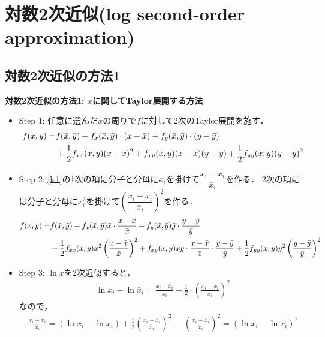 \documentclass[a4paper,12pt,onecolumn,oneside,notitlepage,final]{article}
\begin{document}
\section{対数2次近似(log second-order approximation)}
\subsection{対数2次近似の方法1}

\begin{itembox}[l]{{\bf 対数2次近似の方法1: $x$に関してTaylor展開する方法}}
\begin{itemize}
\item Step 1: 任意に選んだ$\bar x$の周りで$f$に対して2次のTaylor展開を施す．
\begin{align}
f(x,y) = &f(\bar x, \bar y) + f_x(\bar x, \bar y) \cdot (x-\bar x) + f_y(\bar x, \bar y) \cdot (y-\bar y)\notag \\
&+ \frac{1}{2}f_{xx}(\bar x, \bar y) (x-\bar x)^2 + f_{xy}(\bar x, \bar y) (x-\bar x)(y-\bar y) + \frac{1}{2}f_{yy}(\bar x, \bar y) (y-\bar y)^2 \label{ls1}
\end{align}
\item Step 2: \eqref{ls1}の1次の項に分子と分母に$x_i$を掛けて$\dfrac{x_i-\bar x_i}{\bar x_i}$を作る． 2次の項には分子と分母に$x_i^2$を掛けて$\left(\dfrac{x_i-\bar x_i}{\bar x_i}\right)^2$を作る．
\begin{align}
f(x,y) = &f(\bar x, \bar y) + f_x(\bar x, \bar y) \bar x \cdot \frac{x - \bar x}{\bar x} + f_y(\bar x, \bar y) \bar y \cdot \frac{y - \bar y}{\bar y} \notag \\
&+\frac{1}{2} f_{xx}(\bar x, \bar y) \bar x^2 \left(\frac{x-\bar x}{\bar x}\right)^2 + f_{xy}(\bar x, \bar y) \bar x \bar y \cdot \frac{x-\bar x}{\bar x}\cdot \frac{y-\bar y}{\bar y} + \frac{1}{2} f_{yy}(\bar x, \bar y) \bar y^2 \left(\frac{y-\bar y}{\bar y}\right)^2 \label{sn2}
\end{align}
\item Step 3: $\ln x$を2次近似すると，
\begin{align*}
\ln x_i - \ln \bar x_i = \frac{x_i - \bar x_i}{\bar x_i} - \frac{1}{2}\cdot \left(\frac{x_i - \bar x_i}{\bar x_i}\right)^2
\end{align*}
なので，
\begin{align}
\frac{x_i - \bar x_i}{\bar x_i} = (\ln x_i - \ln \bar x_i) + \frac{1}{2}\left(\frac{x_i - \bar x_i}{\bar x_i}\right)^2, \quad \left(\frac{x_i - \bar x_i}{\bar x_i}\right)^2 = (\ln x_i - \ln \bar x_i)^2 \label{lnxend}
\end{align}

\end{itemize}
\end{itembox}
\end{document}
